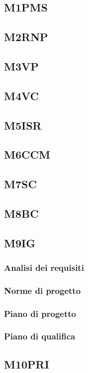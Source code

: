 {{{{{{{{{{{{{\subsection{M1PMS}
\subsection{M2RNP}
\subsection{M3VP}
\subsection{M4VC}
\subsection{M5ISR}
\subsection{M6CCM}
\subsection{M7SC}
\subsection{M8BC}
\subsection{M9IG}
\subsubsection{Analisi dei requisiti}
\subsubsection{Norme di progetto}
\subsubsection{Piano di progetto}

\subsubsection{Piano di qualifica}
\subsection{M10PRI}
}}}}}}}}}}}}}
